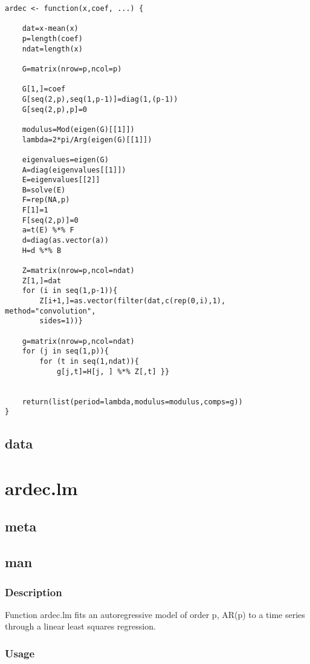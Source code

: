 \documentclass[11pt]{article}
\begin{document}
\lstset{language=R,numbers=none}
\begin{lstlisting}
ardec <- function(x,coef, ...) {

    dat=x-mean(x)
    p=length(coef)
    ndat=length(x)

    G=matrix(nrow=p,ncol=p)

    G[1,]=coef
    G[seq(2,p),seq(1,p-1)]=diag(1,(p-1))
    G[seq(2,p),p]=0

    modulus=Mod(eigen(G)[[1]])
    lambda=2*pi/Arg(eigen(G)[[1]])

    eigenvalues=eigen(G)
    A=diag(eigenvalues[[1]])
    E=eigenvalues[[2]]
    B=solve(E)
    F=rep(NA,p)
    F[1]=1
    F[seq(2,p)]=0
    a=t(E) %*% F
    d=diag(as.vector(a))
    H=d %*% B

    Z=matrix(nrow=p,ncol=ndat)
    Z[1,]=dat
    for (i in seq(1,p-1)){
        Z[i+1,]=as.vector(filter(dat,c(rep(0,i),1), method="convolution",
        sides=1))}

    g=matrix(nrow=p,ncol=ndat)
    for (j in seq(1,p)){
        for (t in seq(1,ndat)){
            g[j,t]=H[j, ] %*% Z[,t] }}


    return(list(period=lambda,modulus=modulus,comps=g))
}
\end{lstlisting}
\subsection{data}
\label{sec-1-4}
\section{ardec.lm}
\label{sec-2}
\subsection{meta}
\label{sec-2-1}
\subsection{man}
\label{sec-2-2}
\subsubsection{Description}
\label{sec-2-2-1}

Function ardec.lm fits an autoregressive model of order p, AR(p) to a time
series through a linear least squares regression.
\subsubsection{Usage}
\label{sec-2-2-2}
\end{document}

